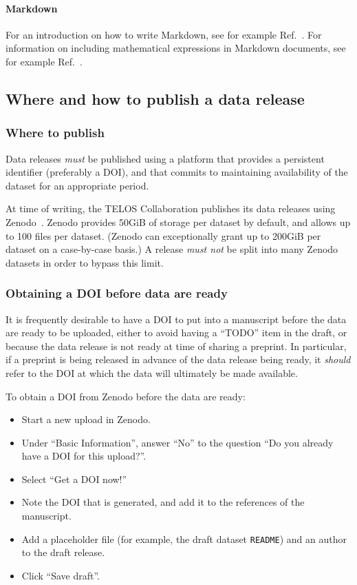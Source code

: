 \documentclass{article}
\newcommand\rfcword[1]{\emph{#1}\xspace}
\newcommand\must{\rfcword{must}}
\newcommand\mustnot{\rfcword{must not}}
\newcommand\should{\rfcword{should}}
\newcommand\filename[1]{\texttt{#1}\xspace}
\newcommand\readme{\filename{README}}
\begin{document}
\paragraph{Markdown}

For an introduction on how to write Markdown,
see for example Ref.~\cite{markdown-guide}.
For information on including mathematical expressions in Markdown documents,
see for example Ref.~\cite{github-markdown}.

\subsection{Where and how to publish a data release}\label{sec:publish-data}

\subsubsection{Where to publish}\label{sec:where}

Data releases \must be published using a platform that provides a persistent identifier
(preferably a DOI),
and that commits to maintaining availability of the dataset for an appropriate period.

At time of writing,
the TELOS Collaboration publishes its data releases using Zenodo~\cite{zenodo}.
Zenodo provides 50GiB of storage per dataset by default,
and allows up to 100 files per dataset.
(Zenodo can exceptionally grant up to 200GiB per dataset on a case-by-case basis.)
A release \mustnot be split into many Zenodo datasets in order to bypass this limit.

\subsubsection{Obtaining a DOI before data are ready}\label{sec:get-doi}

It is frequently desirable to have a DOI to put into a manuscript
before the data are ready to be uploaded,
either to avoid having a ``TODO'' item in the draft,
or because the data release is not ready at time of sharing a preprint.
In particular,
if a preprint is being released in advance of the data release being ready,
it \should refer to the DOI at which the data will ultimately be made available.

To obtain a DOI from Zenodo before the data are ready:

\begin{itemize}
  \item
        Start a new upload in Zenodo.
  \item
        Under ``Basic Information'', answer ``No'' to the question
        ``Do you already have a DOI for this upload?''.
  \item
        Select ``Get a DOI now!''
  \item
        Note the DOI that is generated,
        and add it to the references of the manuscript.
  \item
        Add a placeholder file
        (for example, the draft dataset \readme)
        and an author to the draft release.
  \item
        Click ``Save draft''.
\end{itemize}
\end{document}
